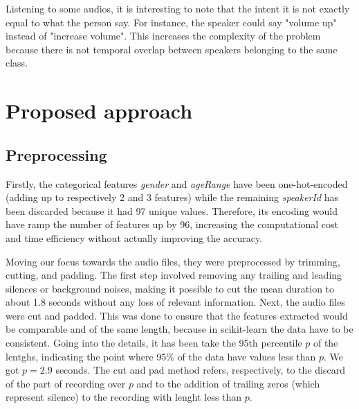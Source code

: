 \documentclass[conference]{IEEEtran}
\begin{document}
Listening to some audios, it is interesting to note that the intent it is not exactly equal to what the person say.
For instance, the speaker could say "volume up" instead of "increase volume".
This increases the complexity of the problem because there is not temporal overlap between speakers belonging to the same class.

\section{Proposed approach}
\subsection{Preprocessing}

Firstly, the categorical features \textit{gender} and \textit{ageRange} have been one-hot-encoded (adding up to respectively 2 and 3 features) while the remaining \textit{speakerId} has been discarded because it had 97 unique values.
Therefore, its encoding would have ramp the number of features up by 96, increasing the computational cost and time efficiency without actually improving the accuracy.

Moving our focus towards the audio files, they were preprocessed by trimming, cutting, and padding.
The first step involved removing any trailing and leading silences or background noises, making it possible to cut the mean duration to about 1.8 seconds without any loss of relevant information.
Next, the audio files were cut and padded.
This was done to ensure that the features extracted would be comparable and of the same length, because in scikit-learn the data have to be consistent.
Going into the details, it has been take the 95th percentile $p$ of the lentghs, indicating the point where 95\% of the data have values less than $p$.
We got $p = 2.9$ seconds.
The cut and pad method refers, respectively, to the discard of the part of recording over $p$ and to the addition of trailing zeros (which represent silence) to the recording with lenght less than $p$.
\end{document}
